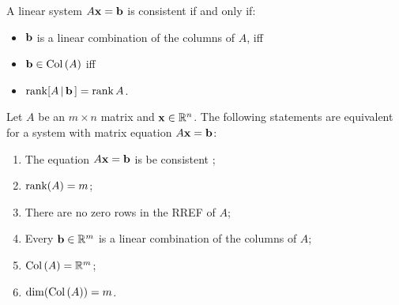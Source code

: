 A linear system $A\mathbf{x} = \mathbf{b}$ is consistent if and only if:
\begin{itemize}

\item $\mathbf{b}$ is a linear combination of the columns of $A$, iff
\item $\mathbf{b} \in \operatorname{Col\,}(A)$ iff
\item $\operatorname{rank} [ A\, |\,\mathbf{b}\,]=\operatorname{rank} A$.
\end{itemize}

\begin{theorem}Let $A$ be an $m\times n$ matrix and $\mathbf{x}\in \mathbb{R}^n$.  The following statements are equivalent for a system with matrix equation $A\mathbf{x}=\mathbf{b}$:

\begin{enumerate}[(1)]
\item The equation $A\mathbf{x} = \mathbf{b}$  is be consistent ;
\item $\textrm{rank}(A) = m$; 
\item There are no zero rows in the RREF of $A$; 


\item Every $\mathbf{b} \in \mathbb{R}^m$ is a linear combination of the columns of $A$;  
\item $\operatorname{Col\,}(A) = \mathbb{R}^m$;  
\item $\dim(\operatorname{Col\,}(A)) = m$.  
 
\end{enumerate}
\end{theorem}

